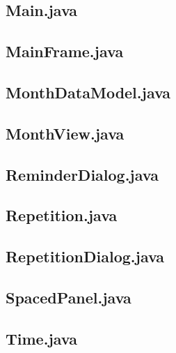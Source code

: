 \documentclass{article}
\begin{document}


\subsection{Main.java}



\subsection{MainFrame.java}



\subsection{MonthDataModel.java}



\subsection{MonthView.java}



\subsection{ReminderDialog.java}



\subsection{Repetition.java}



\subsection{RepetitionDialog.java}



\subsection{SpacedPanel.java}



\subsection{Time.java}
\end{document}
